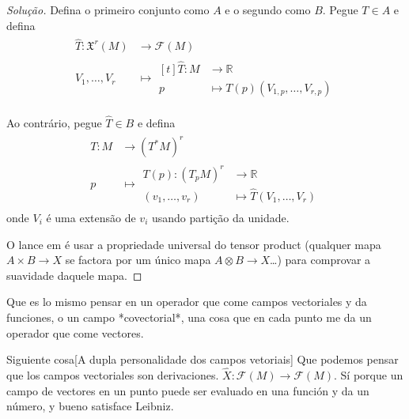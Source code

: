 \begin{proof}[Solução]\leavevmode
	Defina o primeiro conjunto como \(A\) e o segundo como \(B\). Pegue \(T \in A\) e defina
\begin{align*}
	\begin{aligned}
		\hat{T}:\mathfrak{X}^r(M) &\longrightarrow\mathcal{F}(M)\\
		V_1,\ldots,V_r &  \longmapsto 
		\begin{aligned}[t]
			\hat{T}: M &\longrightarrow \mathbb{R} \\
			p &\longmapsto T(p)(V_{1,p},\ldots,V_{r,p})
		\end{aligned}
	\end{aligned}
\end{align*}

Ao contrário, pegue \(\hat{T} \in B\) e defina
\begin{align*}
\begin{aligned}
	T: M &\longrightarrow  (T^*M)^r\\
	 p&\longmapsto \begin{aligned}
	 	T(p): (T_pM)^r &\longrightarrow \mathbb{R} \\
		(v_1,\ldots,v_r) &\longmapsto \hat{T}(V_1,\ldots,V_r)
	 \end{aligned}
\end{aligned}
\end{align*}
onde \(V_i\) é uma extensão de \(v_i\) usando partição da unidade.

O lance em  \cite{tud} é usar a propriedade universal do tensor product (qualquer mapa \(A\times B \to X\) se factora por um único mapa  \(A \otimes B \to X\)…)  para comprovar a suavidade daquele mapa.
\end{proof}

\begin{upshot}\leavevmode
Que es lo mismo pensar en un operador que come campos vectoriales y da funciones, o un campo {\color{6}*covectorial*}, una cosa que en cada punto me da un operador que come vectores.
\end{upshot}

\begin{thing6}{Siguiente cosa}[A dupla personalidade dos campos vetoriais]\leavevmode
Que podemos pensar que los campos vectoriales son derivaciones. \(\hat{X}:\mathcal{F}(M) \to \mathcal{F}(M)\). Sí porque un campo de vectores en un punto puede ser evaluado en una función y da un número, y bueno satisface Leibniz.
\end{thing6}

